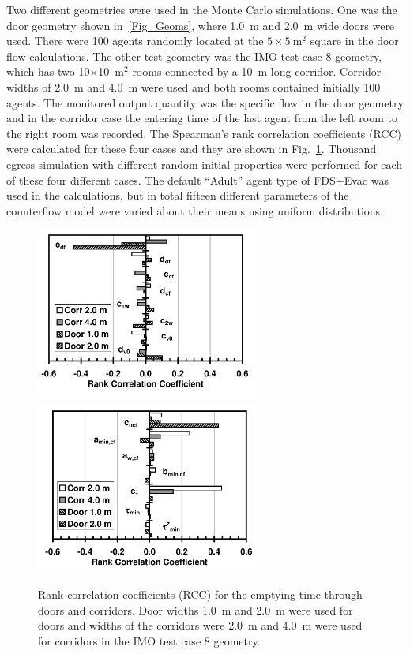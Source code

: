 \documentclass[12pt,a4paper,final,twoside]{stylevk}
\begin{document}
Two different geometries were used in the Monte Carlo simulations.
One was the door geometry shown in~\ref{Fig_Geoms}, where 1.0~m and
2.0~m wide doors were used.  There were 100 agents randomly located at
the $5 \times 5 ~\mathrm{ \textrm{m}^\textrm{2} } $ square in the door
flow calculations.  The other test geometry was the IMO test case 8
geometry, which has two 10$\times$10~$\mathrm{m^2}$ rooms connected by
a 10~m long corridor.  Corridor widths of 2.0~m and 4.0~m were used
and both rooms contained initially 100 agents.  The monitored output
quantity was the specific flow in the door geometry and in the
corridor case the entering time of the last agent from the left room
to the right room was recorded.  The Spearman's rank correlation
coefficients (RCC) were calculated for these four cases and they are
shown in Fig.~\ref{Fig_RCC_CF}.  Thousand egress simulation with
different random initial properties were performed for each of these
four different cases.  The default ``Adult'' agent type of FDS+Evac
was used in the calculations, but in total fifteen different
parameters of the counterflow model were varied about their means
using uniform distributions.

%
\begin{figure}[!tb]
  \centerline{\includegraphics[clip=true,
      width=75mm]{FIGURES/Collect_RCC_Fds600Evac241_CF1}  
      \includegraphics[clip=true,
      width=75mm]{FIGURES/Collect_RCC_Fds600Evac241_CF2} } 
  \caption{Rank correlation coefficients (RCC) for the emptying time
    through doors and corridors.  Door widths 1.0~m and 2.0~m were
    used for doors and widths of the corridors were 2.0~m and 4.0~m
    were used for corridors in the IMO test case 8
    geometry.}\label{Fig_RCC_CF}
\end{figure}
%
\end{document}
